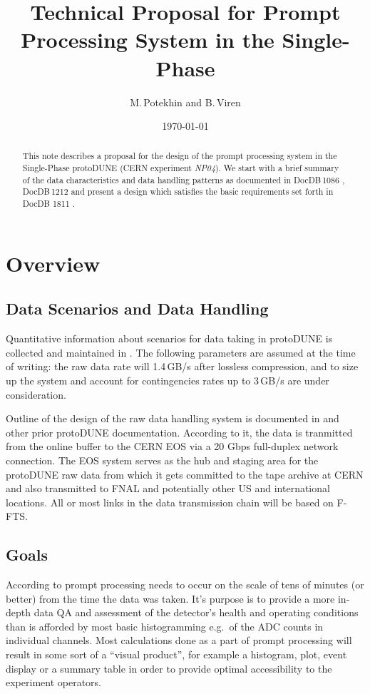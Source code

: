 \documentclass[pdftex,12pt,letter]{article}
\title{Technical Proposal for Prompt Processing System in the Single-Phase \pd}
\date{\today}
\author{M.\,Potekhin and B.\,Viren}
\newcommand{\pd}{protoDUNE\xspace}
\newcommand{\expname}{\textit{NP04}\xspace}
\begin{document}
\maketitle

\begin{abstract}
\noindent  This note describes a proposal for the design of
the prompt processing system in the Single-Phase \pd
(CERN experiment \expname). We start with a brief summary of the data characteristics and data handling patterns
as documented in DocDB\,1086 \cite{docdb1086}, DocDB\,1212 \cite{docdb1212} and present a design which
satisfies the basic requirements set forth in  DocDB 1811 \cite{docdb1811}.
\end{abstract}


\section{Overview}
\subsection{Data Scenarios and Data Handling}
\label{sec:rawdata}
Quantitative information about scenarios for data taking in \pd is collected and maintained in \cite{docdb1086}. The following parameters
are assumed at the time of writing: the raw data rate will 1.4\,GB/s after lossless compression, and to size up
the system and account for contingencies rates up to 3\,GB/s are under consideration.

Outline of the design of the raw data handling system is documented in  \cite{docdb1212} and other prior \pd documentation.
According to it, the data is tranmitted from the online buffer to the CERN EOS via a 20 Gbps full-duplex network connection.
The EOS system serves as the hub and staging area for the \pd raw data from which
it gets committed to the tape archive at CERN and also transmitted to FNAL and potentially
other US and international locations. All or most links in the data transmission chain will be based on F-FTS.

\subsection{Goals}
\label{sec:outline}
According to \cite{docdb1811}  prompt processing needs to occur on the scale
of tens of minutes (or better) from the time the data was taken. It's purpose is to
provide a more in-depth data QA and assessment of the detector's health and operating conditions
than is afforded by most basic histogramming e.g.~of the ADC counts in individual channels. Most calculations
done as a part of prompt processing will result in some sort of a ``visual product'', for example a histogram,
plot, event display or a summary table in order to provide optimal accessibility to the experiment
operators.
\end{document}
